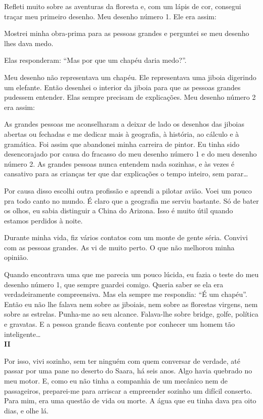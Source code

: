 \begin{Parallel}[p]{}{}
{Refleti muito sobre as aventuras da floresta e, com um lápis de cor,
consegui traçar meu primeiro desenho. Meu desenho número 1. Ele era
assim:

Mostrei minha obra-prima para as pessoas grandes e perguntei se meu
desenho lhes dava medo.

Elas responderam: ``Mas por que um chapéu daria medo?''.

Meu desenho não representava um chapéu. Ele representava uma jiboia
digerindo um elefante. Então desenhei o interior da jiboia para que as
pessoas grandes pudessem entender. Elas sempre precisam de explicações.
Meu desenho número 2 era assim:

As grandes pessoas me aconselharam a deixar de lado os desenhos das
jiboias abertas ou fechadas e me dedicar mais à geografia, à história,
ao cálculo e à gramática. Foi assim que abandonei minha carreira de
pintor. Eu tinha sido desencorajado por causa do fracasso do meu desenho
número 1 e do meu desenho número 2. As grandes pessoas nunca entendem
nada sozinhas, e às vezes é cansativo para as crianças ter que dar
explicações o tempo inteiro, sem parar\ldots{}

Por causa disso escolhi outra profissão e aprendi a pilotar avião. Voei
um pouco pra todo canto no mundo. É claro que a geografia me serviu
bastante. Só de bater os olhos, eu sabia distinguir a China do Arizona.
Isso é muito útil quando estamos perdidos à noite.

Durante minha vida, fiz vários contatos com um monte de gente séria.
Convivi com as pessoas grandes. As vi de muito perto. O que não melhorou
minha opinião.

Quando encontrava uma que me parecia um pouco lúcida, eu fazia o teste
do meu desenho número 1, que sempre guardei comigo. Queria saber se ela
era verdadeiramente compreensiva. Mas ela sempre me respondia: ``É um
chapéu''. Então eu não lhe falava nem sobre as jiboiais, nem sobre as
florestas virgens, nem sobre as estrelas. Punha-me ao seu alcance.
Falava-lhe sobre bridge, golfe, política e gravatas. E a pessoa grande
ficava contente por conhecer um homem tão inteligente\ldots{}\\

\textbf{II}

Por isso, vivi sozinho, sem ter ninguém com quem conversar de verdade,
até passar por uma pane no deserto do Saara, há seis anos. Algo havia
quebrado no meu motor. E, como eu não tinha a companhia de um mecânico
nem de passageiros, preparei-me para arriscar a empreender sozinho um
difícil conserto. Para mim, era uma questão de vida ou morte. A água que
eu tinha dava pra oito dias, e olhe lá.

}
\end{Parallel}
